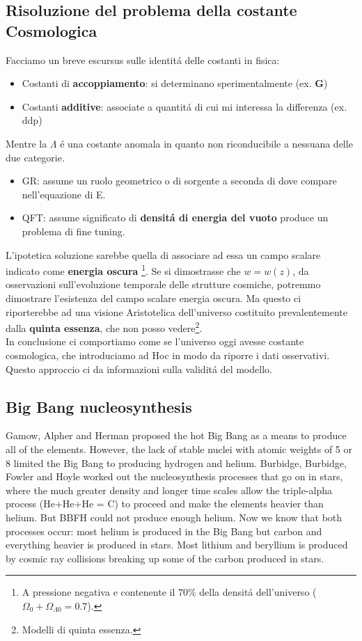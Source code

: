 \documentclass[12pt, a4paper]{article}
\begin{document}
\subsection{Risoluzione del problema della costante Cosmologica}
Facciamo un breve escursus sulle identit\'{a} delle costanti in fisica:
\begin{itemize}
\item Costanti di \textbf{accoppiamento}: si determinano sperimentalmente (ex. \textbf{G})
\item Costanti \textbf{additive}: associate a quantit\'{a} di cui mi interessa la differenza (ex. ddp)
\end{itemize}
Mentre la $\Lambda$ \'{e} una costante anomala in quanto non riconducibile a nessuana delle due categorie.
\begin{itemize}
\item GR: assume un ruolo geometrico o di sorgente a seconda di dove compare nell'equazione di E.
\item QFT: assume significato di \textbf{densit\'{a} di energia del vuoto} produce un problema di fine tuning.
\end{itemize}
L'ipotetica soluzione sarebbe quella di associare ad essa un campo scalare  indicato come \textbf{energia oscura} \footnote{A pressione negativa e contenente il $70\%$ della densit\'{a} dell'universo ($\Omega_0+ \Omega_{\Lambda 0}=0.7$).}. Se si dimostrasse che $w=w(z)$, da osservazioni sull'evoluzione temporale delle strutture cosmiche, potremmo dimostrare l'esistenza del campo scalare energia oscura. Ma questo ci riporterebbe ad una visione Aristotelica dell'universo costituito prevalentemente dalla \textbf{quinta essenza}, che non posso vedere\footnote{Modelli di quinta essenza.}.\\ In conclusione ci comportiamo come se l'universo oggi avesse costante cosmologica, che introduciamo ad Hoc in modo da riporre i dati osservativi. Questo approccio ci da informazioni sulla validit\'{a} del modello.
\subsection{Big Bang nucleosynthesis}
Gamow, Alpher and Herman proposed the hot Big Bang as a means to produce all of the elements. However, the lack of stable nuclei with atomic weights of 5 or 8 limited the Big Bang to producing hydrogen and helium. Burbidge, Burbidge, Fowler and Hoyle worked out the nucleosynthesis processes that go on in stars, where the much greater density and longer time scales allow the triple-alpha process (He+He+He = C) to proceed and make the elements heavier than helium. But BBFH could not produce enough helium. Now we know that both processes occur: most helium is produced in the Big Bang but carbon and everything heavier is produced in stars. Most lithium and beryllium is produced by cosmic ray collisions breaking up some of the carbon produced in stars.
\end{document}
